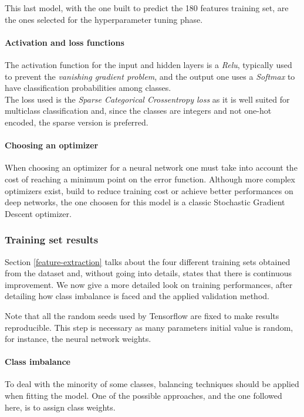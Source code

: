 This last model, with the one built to predict the 180 features training set, are the ones selected for 
the hyperparameter tuning phase. 

\paragraph{Activation and loss functions}
The activation function for the input and hidden layers is a \emph{Relu}, 
typically used to prevent the \emph{vanishing gradient problem}, 
and the output one uses a \emph{Softmax} to have classification probabilities
among classes.~\cite{relu}\cite{soft}\cite{vanishing}\\
The loss used is the \emph{Sparse Categorical Crossentropy loss} as it 
is well suited for multiclass classification and, since 
the classes are integers and not one-hot encoded, the sparse version is preferred.~\cite{entropy}

\paragraph{Choosing an optimizer}
When choosing an optimizer for a neural network one must take into account the 
cost of reaching a minimum point on the error function.
Although more complex optimizers exist, build to reduce training 
cost or achieve better performances on deep networks, the one choosen 
for this model is a classic Stochastic Gradient Descent optimizer.

\subsubsection{Training set results}

Section \vref{feature-extraction} talks about the four different 
training sets obtained from the dataset and, without going into details, 
states that there is continuous improvement. 
We now give a more detailed look on training performances, after 
detailing how class imbalance is faced and the applied validation method.

Note that all the random seeds used by Tensorflow are fixed 
to make results reproducible. This step is necessary as many parameters initial 
value is random, for instance, the neural network weights.

\paragraph{Class imbalance}
To deal with the minority of some classes, balancing techniques should be 
applied when fitting the model. One of the possible approaches, and the one followed
here, is to assign class weights. 

